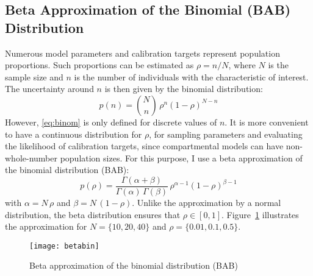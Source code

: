 \subsection{Beta Approximation of the Binomial (BAB) Distribution}\label{app.math.distr.bab}
Numerous model parameters and calibration targets represent population proportions.
Such proportions can be estimated as $\rho = n / N$, where
$N$ is the sample size and $n$ is the number of individuals with the characteristic of interest.
The uncertainty around $n$ is then given by the binomial distribution:
\begin{equation}\label{eq:binom}
  p(n) = {N \choose n} \, \rho^{n}{(1 - \rho)}^{N - n}
\end{equation}
However, \eqref{eq:binom} is only defined for discrete values of $n$.
It is more convenient to have a continuous distribution for $\rho$,
for sampling parameters and evaluating the likelihood of calibration targets,
since compartmental models can have non-whole-number population sizes.
For this purpose, I use a beta approximation of the binomial distribution (BAB):
\begin{equation}\label{eq:beta}
  p(\rho) =
    \frac{\Gamma(\alpha+\beta)}{\Gamma(\alpha)\,\Gamma(\beta)}\,
    \rho^{\alpha-1}{(1 - \rho)}^{\beta-1}
\end{equation}
with $\alpha = N\,\rho$ and $\beta = N\,(1-\rho)$.
Unlike the approximation by a normal distribution,
the beta distribution ensures that $\rho \in [0,1]$.
Figure~\ref{fig:betabin} illustrates the approximation for
$N = \{10,20,40\}$ and $\rho = \{0.01,0.1,0.5\}$.
\begin{figure}
  \centering
  \texttt{[image: betabin]}
  \caption{Beta approximation of the binomial distribution (BAB)}
  \label{fig:betabin}
\end{figure}
